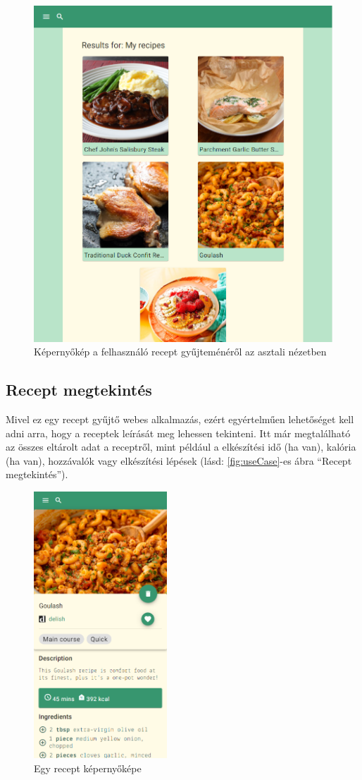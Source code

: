 \documentclass[12pt]{report}
\theoremstyle{definition}
\begin{document}
\begin{figure}[H]%
    \centering
    \includegraphics[width=11.5cm]{pictures/web_recipeCollection.png}
	\caption{Képernyőkép a felhasználó recept gyűjteménéről az asztali nézetben}%
    \label{fig:collection}%
\end{figure}


\subsection{Recept megtekintés}
Mivel ez egy recept gyűjtő webes alkalmazás, ezért egyértelműen lehetőséget kell adni arra, hogy a receptek leírását meg lehessen tekinteni. Itt már megtalálható az összes eltárolt adat a receptről, mint például a elkészítési idő (ha van), kalória (ha van), hozzávalók vagy elkészítési lépések (lásd: \ref{fig:useCase}-es ábra “Recept megtekintés”).

\begin{figure}[H]%
    \centering
    \includegraphics[width=5cm]{pictures/mobil_recipe-top.png}
	\caption{Egy recept képernyőképe}%
    \label{fig:recipe}%
\end{figure}
\end{document}
